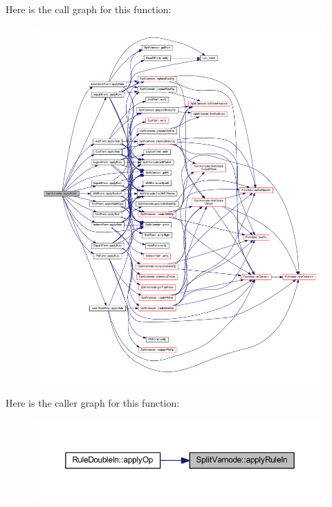 Here is the call graph for this function\+:
\nopagebreak
\begin{figure}[H]
\begin{center}
\leavevmode
\includegraphics[width=350pt]{class_split_varnode_a07d18e3a13c7be35cd42f1762214d3f8_cgraph}
\end{center}
\end{figure}
Here is the caller graph for this function\+:
\nopagebreak
\begin{figure}[H]
\begin{center}
\leavevmode
\includegraphics[width=350pt]{class_split_varnode_a07d18e3a13c7be35cd42f1762214d3f8_icgraph}
\end{center}
\end{figure}
\mbox{\label{class_split_varnode_a09d3bd3c551ee55ef42da4f01bc44f49}} 
